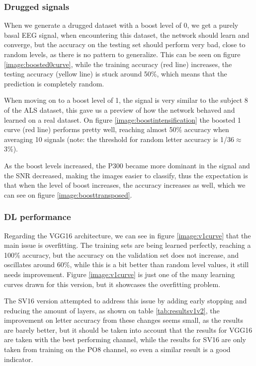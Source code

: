 \documentclass[conference]{IEEEtran}
\begin{document}
\subsubsection{Drugged signals}
When we generate a drugged dataset with a boost level of 0, we get a purely basal EEG signal, when encountering this dataset, the network should learn and converge, but the accuracy on the testing set should perform very bad, close to random levels, as there is no pattern to generalize. This can be seen on figure \ref{image:boosted0curve}, while the training accuracy (red line) increases, the testing accuracy (yellow line) is stuck around 50\%, which means that the prediction is completely random.

When moving on to a boost level of 1, the signal is very similar to the subject 8 of the ALS dataset, this gave us a preview of how the network behaved and learned on a real dataset. On figure \ref{image:boostintensification} the boosted 1 curve (red line) performs pretty well, reaching almost 50\% accuracy when averaging 10 signals (note: the threshold for random letter accuracy is 1/36$\approx$3\%).

As the boost levels increased, the P300 became more dominant in the signal and the SNR decreased, making the images easier to classify, thus the expectation is that when the level of boost increases, the accuracy increases as well, which we can see on figure \ref{image:boosttransposed}.

\subsubsection{DL performance}

Regarding the VGG16 architecture, we  can see in figure \ref{image:v1curve} that the main issue is overfitting. The training sets are being learned perfectly, reaching a 100\% accuracy, but the accuracy on the validation set does not increase, and oscillates around 60\%, while this is a bit better than random level values, it still needs improvement. Figure \ref{image:v1curve} is just one of the many learning curves drawn for this version, but it showcases the overfitting problem.

The SV16 version attempted to address this issue by adding early stopping and reducing the amount of layers, as shown on table \ref{tab:resultsv1v2}, the improvement on letter accuracy from these changes seems small, as the results are barely better, but it should be taken into account that the results for VGG16 are taken with the best performing channel, while the results for SV16 are only taken from training on the PO8 channel, so even a similar result is a good indicator.
\end{document}
